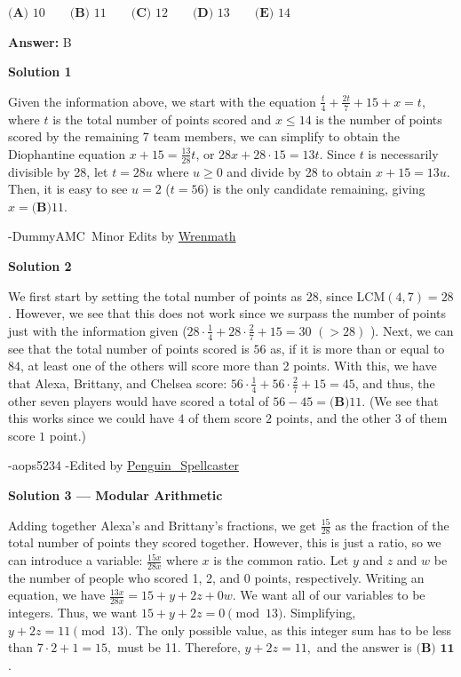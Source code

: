 \begin{enumerate}
 $\textbf{(A) }10\qquad\textbf{(B) }11\qquad\textbf{(C) }12\qquad\textbf{(D) }13\qquad\textbf{(E) }14$

 \textbf{Answer: }B



\textbf{Solution 1}

Given the information above, we start with the equation $\frac{t}{4}+\frac{2t}{7} + 15 + x = t$, where $t$ is the total number of points scored and $x\le 14$ is the number of points scored by the remaining 7 team members, we can simplify to obtain the Diophantine equation $x+15 = \frac{13}{28}t$, or $28x+28\cdot 15=13t$. Since $t$ is necessarily divisible by 28, let $t=28u$ where $u \ge 0$ and divide by 28 to obtain $x + 15 = 13u$. Then, it is easy to see $u=2$ ($t=56$) is the only candidate remaining, giving $x=\boxed{\textbf{(B)} 11}$. 

 -DummyAMC~Minor Edits by \href{https://artofproblemsolving.com/wiki/index.php?title=User:Wrenmath}{Wrenmath}

 



\textbf{Solution 2}

We first start by setting the total number of points as $28$, since $\text{LCM}(4,7) = 28$. However, we see that this does not work since we surpass the number of points just with the information given ($28\cdot\frac{1}{4}+28\cdot\frac{2}{7} + 15 = 30$ $(> 28)$ ). Next, we can see that the total number of points scored is $56$ as, if it is more than or equal to $84$, at least one of the others will score more than 2 points. With this, we have that Alexa, Brittany, and Chelsea score: $56\cdot\frac{1}{4}+56\cdot\frac{2}{7} + 15 = 45$, and thus, the other seven players would have scored a total of $56-45 = \boxed{\textbf{(B)} 11}$. (We see that this works since we could have $4$ of them score $2$ points, and the other $3$ of them score $1$ point.) 

 -aops5234 -Edited by \href{https://artofproblemsolving.com/wiki/index.php?title=User:Penguin\_Spellcaster}{Penguin\_Spellcaster}

 



\textbf{Solution 3 — Modular Arithmetic}

Adding together Alexa's and Brittany's fractions, we get $\frac{15}{28}$ as the fraction of the total number of points they scored together. However, this is just a ratio, so we can introduce a variable: $\frac{15x}{28x}$ where $x$ is the common ratio. Let $y$ and $z$ and $w$ be the number of people who scored 1, 2, and 0 points, respectively. Writing an equation, we have $\frac{13x}{28x} = 15 + y + 2z + 0w.$ We want all of our variables to be integers. Thus, we want $15 + y + 2z = 0 \pmod {13}.$ Simplifying, $y+2z = 11 \pmod {13}.$ The only possible value, as this integer sum has to be less than $7 \cdot 2 + 1 = 15,$ must be 11. Therefore, $y+2z = 11,$ and the answer is $\boxed{ \textbf{(B) 11}}$.


\end{enumerate}
